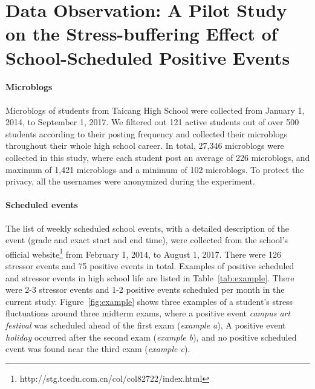 \documentclass[5p,times,numbers,authoryear]{elsarticle}
\begin{document}
\section{Data Observation: A Pilot Study on the Stress-buffering Effect of School-Scheduled Positive Events}
\label{sec:obs}
\paragraph{Microblogs} Microblogs of students from Taicang High School were collected from January 1, 2014, to September 1, 2017.
We filtered out 121 active students out of over 500 students according to their posting frequency 
and collected their microblogs throughout their whole high school career.
In total, 27,346 microblogs were collected in this study, where each student post an average of 226 microblogs, and maximum of 1,421 microblogs and a minimum of 102 microblogs.
To protect the privacy, all the usernames were anonymized during the experiment.

\paragraph{Scheduled events} The list of weekly scheduled school events,
with a detailed description of the event (grade and exact start and end time),
were collected from the school's official website\footnote{http://stg.tcedu.com.cn/col/col82722/index.html} from February 1, 2014, to August 1, 2017.
There were 126 stressor events and 75 positive events in total.
Examples of positive scheduled  and stressor events in high school life are listed in Table~\ref{tab:example}.
There were 2-3 stressor events and 1-2 positive events scheduled per month in the current study.
Figure~\ref{fig:example} shows three examples of a student's stress fluctuations around three midterm exams, where a positive event \emph{campus art festival} was scheduled ahead of the first exam (\emph{example a}),
A positive event \emph{holiday} occurred after the second exam (\emph{example b}),
and no positive scheduled event was found near the third exam (\emph{example c}).


\begin{table}[H]
\caption{\small{Examples of school-scheduled positive and stressor events.}}
\label{tab:example}
\end{table}
\end{document}
